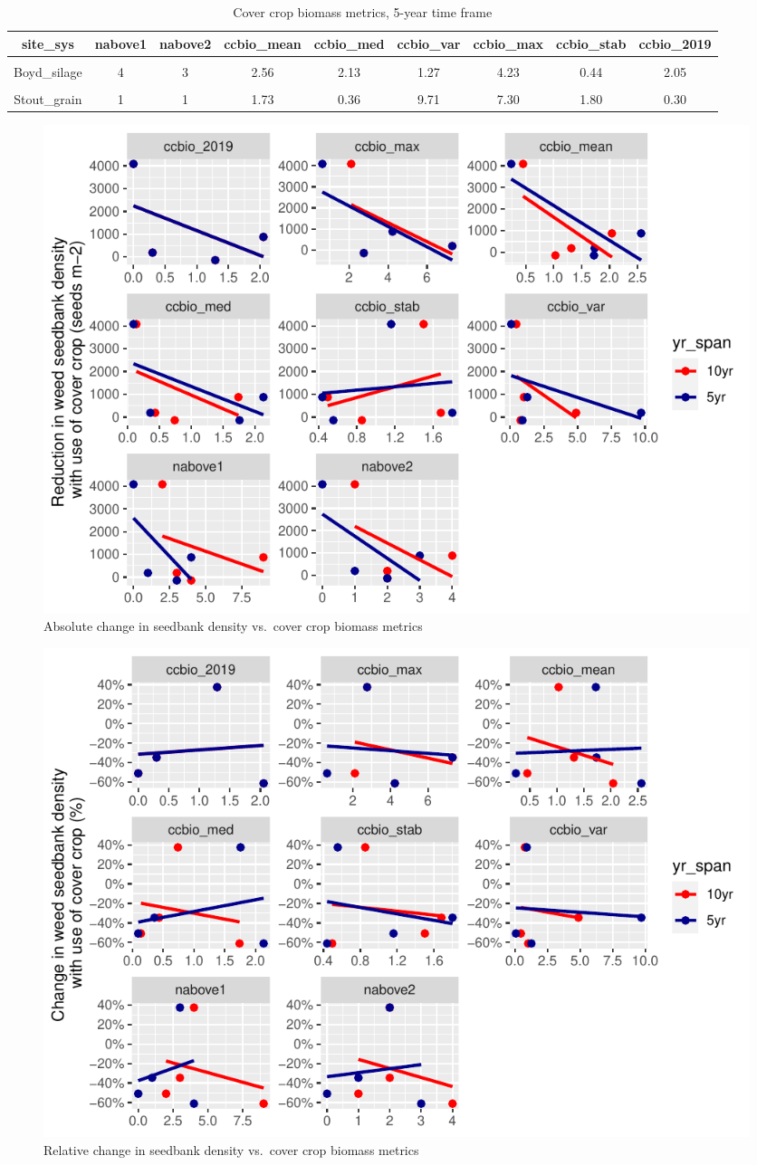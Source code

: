 \documentclass[
]{article}
\begin{document}
\begin{table}[H]

\caption{\label{tab:ccbio5yr}Cover crop biomass metrics, 5-year time frame}
\centering
\begin{tabular}[t]{ccccccccc}
\toprule
site\_sys & nabove1 & nabove2 & ccbio\_mean & ccbio\_med & ccbio\_var & ccbio\_max & ccbio\_stab & ccbio\_2019\\
\midrule
\cellcolor{gray!6}{Boyd\_grain} & \cellcolor{gray!6}{3} & \cellcolor{gray!6}{2} & \cellcolor{gray!6}{1.72} & \cellcolor{gray!6}{1.76} & \cellcolor{gray!6}{0.91} & \cellcolor{gray!6}{2.76} & \cellcolor{gray!6}{0.55} & \cellcolor{gray!6}{1.29}\\
Boyd\_silage & 4 & 3 & 2.56 & 2.13 & 1.27 & 4.23 & 0.44 & 2.05\\
\cmidrule{1-9}
\cellcolor{gray!6}{Funcke\_grain} & \cellcolor{gray!6}{0} & \cellcolor{gray!6}{0} & \cellcolor{gray!6}{0.24} & \cellcolor{gray!6}{0.09} & \cellcolor{gray!6}{0.08} & \cellcolor{gray!6}{0.63} & \cellcolor{gray!6}{1.16} & \cellcolor{gray!6}{0.00}\\
Stout\_grain & 1 & 1 & 1.73 & 0.36 & 9.71 & 7.30 & 1.80 & 0.30\\
\bottomrule
\end{tabular}
\end{table}

\begin{figure}
\centering
\includegraphics{supp-mat_files/figure-latex/unnamed-chunk-2-1.pdf}
\caption{Absolute change in seedbank density vs.~cover crop biomass
metrics}
\end{figure}

\begin{figure}
\centering
\includegraphics{supp-mat_files/figure-latex/unnamed-chunk-3-1.pdf}
\caption{Relative change in seedbank density vs.~cover crop biomass
metrics}
\end{figure}
\end{document}
